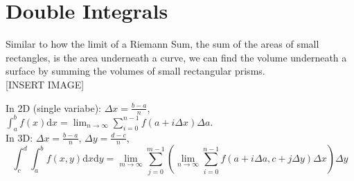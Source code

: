 \section{Double Integrals}
\noindent
Similar to how the limit of a Riemann Sum, the sum of the areas of small rectangles, is the area underneath a curve, we can find the volume underneath a surface by summing the volumes of small rectangular prisms.\\

[INSERT IMAGE]

\noindent
In 2D (single variabe): $\Delta x = \frac{b-a}{n}$, $\int_{a}^{b}{f(x)\mathrm{d}x} = \lim_{n \to \infty}{\sum_{i = 0}^{n-1}{f(a+i\Delta x)\Delta a}}$.\\
In 3D: $\Delta x = \frac{b-a}{n}$, $\Delta y = \frac{d-c}{n}$,
\begin{equation*}
	\int_{c}^{d}{\int_{a}^{b}{f(x,y)\mathrm{d}x}\mathrm{d}y} = \lim_{m \to \infty}{\sum_{j = 0}^{m-1}{\left(\lim_{n \to \infty}{\sum_{i = 0}^{n-1}{f(a+i\Delta a, c+j\Delta y)\Delta x}}\right)\Delta y}}
\end{equation*}



